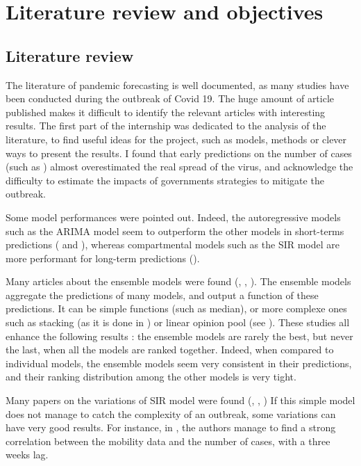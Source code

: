 \section{Literature review and objectives}

\subsection{Literature review}

The literature of pandemic forecasting is well documented, as many studies have been conducted during the outbreak of Covid 19. 
The huge amount of article published makes it difficult to identify the relevant articles with interesting results. 
The first part of the internship was dedicated to the analysis of the literature, to find useful ideas for the project, such as models, methods or clever ways to present the results. 
I found that early predictions on the number of cases (such as \cite{gardner2020intervention}) almost overestimated the real spread of the virus, and acknowledge the difficulty to estimate the impacts of governments strategies to mitigate the outbreak. 

Some model performances were pointed out. 
Indeed, the autoregressive models such as the ARIMA model seem to outperform the other models in short-terms predictions (\cite{kufel2020arima} and \cite{shang2021regional}), whereas compartmental models such as the SIR model are more performant for long-term predictions (\cite{rahmandad2022enhancing}).

Many articles about the ensemble models were found (\cite{cramer2022evaluation}, \cite{reich2019accuracy}, \cite{howerton2023evaluation}). 
The ensemble models aggregate the predictions of many models, and output a function of these predictions. 
It can be simple functions (such as median), or more complexe ones such as stacking (as it is done in \cite{reich2019accuracy}) or linear opinion pool (see \cite{howerton2023evaluation}).
These studies all enhance the following results : the ensemble models are rarely the best, but never the last, when all the models are ranked together. 
Indeed, when compared to individual models, the ensemble models seem very consistent in their predictions, and their ranking distribution among the other models is very tight. 

Many papers on the variations of SIR model were found (\cite{gerlee2021predicting}, \cite{hult2020estimates}, \cite{sjodin2020covid})
If this simple model does not manage to catch the complexity of an outbreak, some variations can have very good results. 
For instance, in \cite{gerlee2021predicting}, the authors manage to find a strong correlation between the mobility data and the number of cases, with a three weeks lag. 

